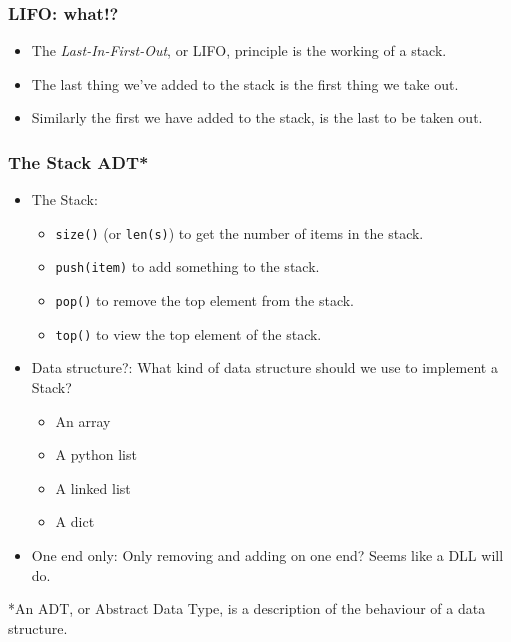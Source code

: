 \begin{frame}
	\frametitle{LIFO: what!?}
		\begin{itemize}
			\item The \textit{Last-In-First-Out}, or LIFO, principle is the working of a stack.
			\item The last thing we've added to the stack is the first thing we take out.
			\item Similarly the first we have added to the stack, is the last to be taken out.
		\end{itemize}	
\end{frame}

\begin{frame}
	\frametitle{The Stack ADT*}
		\begin{itemize}
			\item The Stack:
				\begin{itemize}
					\item \texttt{size()} (or \texttt{len(s)}) to get the number of items in the stack.
					\item \texttt{push(item)} to add something to the stack.
						
					\item \texttt{pop()} to remove the top element from the stack.
					\item \texttt{top()} to view the top element of the stack.
				\end{itemize}
			\item Data structure?: 
				What kind of data structure should we use to implement a Stack?

				\begin{itemize}
					\item An array
					\item A python list
					\item A linked list
					\item A dict
				\end{itemize}
			\item One end only:
				Only removing and adding on one end? Seems like a DLL will do.
			\end{itemize}

						{*\scriptsize An ADT, or Abstract Data Type, is a description of the behaviour of a data structure.}
\end{frame}

